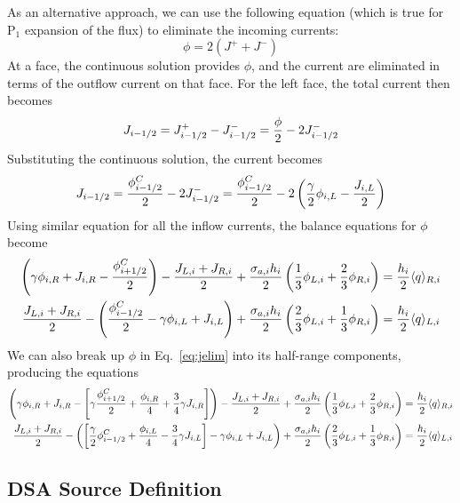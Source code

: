 As an alternative approach, we can use the following equation (which is true for
P$_1$ expansion of the flux) to eliminate the incoming
currents:
\begin{equation}
    \phi = 2(J^+ + J^-)
\end{equation}
At a face, the continuous solution provides $\phi$, and 
the current are eliminated in terms of the outflow current on that face.  For the
left face, the total current then becomes
\begin{equation}\label{eq:jelim}
    J_{{i-1/2}} = J_{{i-1/2}}^+ - J_{{i-1/2}}^- = \frac{\phi}{2} - 2J_{{i-1/2}}^-
\end{equation}
Substituting the continuous solution, the current becomes
\begin{equation}
    J_{{i-1/2}} = \frac{\phi_{{i-1/2}}^C}{2} - 2J^-_{{i-1/2}} = \frac{\phi_{{i-1/2}}^C}{2} -
    2\left(\frac{\gamma}{2}\phi_{i,L} - \frac{J_{i,L}}{2}\right)
\end{equation}
Using similar equation for all the inflow currents, the balance equations for $\phi$
become
\begin{align}
    \left(\gamma\phi_{i,R} + J_{i,R} - \frac{\phi_{{i+1/2}}^C}{2} \right) - \frac{J_{L,i} + J_{R,i}}{2} + \frac{\sigma_{a,i} h_i}{2} \left(\frac{1}{3} \phi_{L,i} +
    \frac{2}{3}\phi_{R,i}\right) &= \frac{h_i}{2} \langle q \rangle_{R,i} \\
    \frac{J_{L,i} + J_{R,i}}{2} -\left(\frac{\phi_{i-1/2}^C}{2} - \gamma \phi_{i,L} +
    J_{i,L}\right) + \frac{\sigma_{a,i} h_i}{2}
    \left(\frac{2}{3} \phi_{L,i} +
    \frac{1}{3}\phi_{R,i}\right) &= \frac{h_i}{2} \langle q \rangle_{L,i} 
\end{align}
We can also break up $\phi$ in Eq.~\eqref{eq:jelim} into its half-range components,
producing the equations
\begin{align}
    \left(\gamma\phi_{i,R} + J_{i,R} - \left[ \gamma\frac{\phi_{{i+1/2}}^C}{2} +
    \frac{\phi_{i,R}}{4} + \frac{3}{4} \gamma J_{i,R} \right] \right) - \frac{J_{L,i} + J_{R,i}}{2} + \frac{\sigma_{a,i} h_i}{2} \left(\frac{1}{3} \phi_{L,i} +
    \frac{2}{3}\phi_{R,i}\right) &= \frac{h_i}{2} \langle q \rangle_{R,i} \\
    \frac{J_{L,i} + J_{R,i}}{2} -\left(\left[ \frac{\gamma}{2} \phi_{i-1/2}^C +
    \frac{\phi_{i,L}}{4} - \frac{3}{4}\gamma J_{i,L} \right] - \gamma \phi_{i,L} +
    J_{i,L}\right) + \frac{\sigma_{a,i} h_i}{2}
    \left(\frac{2}{3} \phi_{L,i} +
    \frac{1}{3}\phi_{R,i}\right) &= \frac{h_i}{2} \langle q \rangle_{L,i} 
\end{align}


\subsection{DSA Source Definition}

